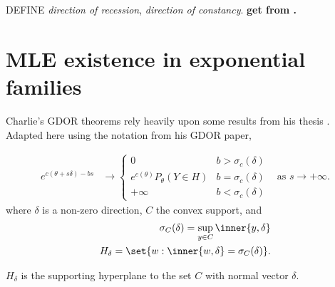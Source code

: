 DEFINE \emph{direction of recession}, \emph{direction of constancy}.  \textbf{get from 
\citep{Rockafellar:1970}.}

\section{MLE existence in exponential families}
Charlie's GDOR theorems rely heavily upon some results from his thesis \citep{Geyer:
1990}.  Adapted here 
using the notation from his GDOR paper,
\begin{theorem}
\begin{align*}
e^{c(\theta + s \delta) - bs} &\to 
		\begin{cases} 
			0 								& b > \sigma_c(\delta) \\
			e^{c(\theta)} P_\theta(Y \in H ) 	& b = \sigma_c(\delta) \\
			+\infty							& b < \sigma_c(\delta)
		\end{cases}
& \text{as } s \to +\infty.
\end{align*}
where $\delta$ is a non-zero direction, $C$ the convex support, and
\begin{align*}
	\sigma_C (\delta) = \sup_{y \in C} \inner{ y, \delta} \\
	H_\delta = \set{w: \inner{w, \delta} = \sigma_C(\delta) }.
\end{align*}
\end{theorem}
$H_\delta$ is the supporting hyperplane to the set $C$ with normal vector $\delta$.

